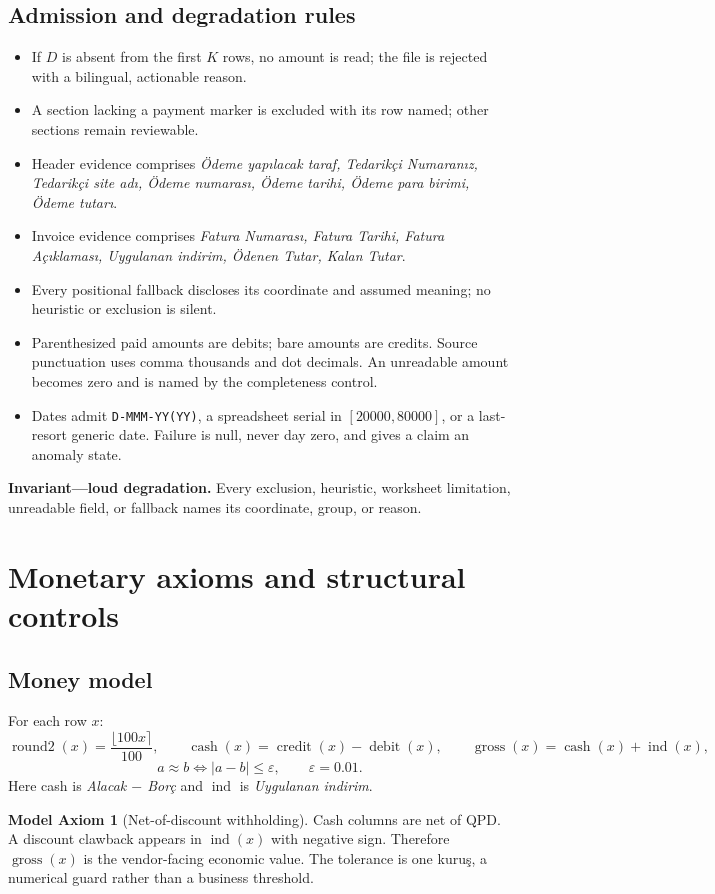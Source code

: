 \documentclass[11pt,a4paper]{article}
\newcommand{\eps}{\varepsilon}
\newcommand{\cash}{\operatorname{cash}}
\newcommand{\gross}{\operatorname{gross}}
\newcommand{\ind}{\operatorname{ind}}
\newcommand{\roundtwo}{\operatorname{round2}}
\theoremstyle{definition}
\newtheorem{axiom}{Model Axiom}
\begin{document}
\subsection{Admission and degradation rules}
\begin{itemize}[leftmargin=1.5em]
\item If $D$ is absent from the first $K$ rows, no amount is read; the
file is rejected with a bilingual, actionable reason.
\item A section lacking a payment marker is excluded with its row named;
other sections remain reviewable.
\item Header evidence comprises \emph{Ödeme yapılacak taraf, Tedarikçi
Numaranız, Tedarikçi site adı, Ödeme numarası, Ödeme tarihi, Ödeme para
birimi, Ödeme tutarı}.
\item Invoice evidence comprises \emph{Fatura Numarası, Fatura Tarihi,
Fatura Açıklaması, Uygulanan indirim, Ödenen Tutar, Kalan Tutar}.
\item Every positional fallback discloses its coordinate and assumed
meaning; no heuristic or exclusion is silent.
\item Parenthesized paid amounts are debits; bare amounts are credits.
Source punctuation uses comma thousands and dot decimals. An unreadable
amount becomes zero and is named by the completeness control.
\item Dates admit \texttt{D-MMM-YY(YY)}, a spreadsheet serial in
$[20000,80000]$, or a last-resort generic date. Failure is null, never
day zero, and gives a claim an anomaly state.
\end{itemize}
\textbf{Invariant---loud degradation.} Every exclusion, heuristic,
worksheet limitation, unreadable field, or fallback names its coordinate,
group, or reason.
\section{Monetary axioms and structural controls}
\subsection{Money model}
For each row $x$:
\[
\roundtwo(x)=\frac{\lfloor100x\rceil}{100},\qquad
\cash(x)=\operatorname{credit}(x)-\operatorname{debit}(x),\qquad
\gross(x)=\cash(x)+\ind(x),
\]
\[
a\approx b\iff |a-b|\le\eps,\qquad \eps=0.01.
\]
Here cash is \emph{Alacak $-$ Borç} and $\ind$ is \emph{Uygulanan
indirim}.

\begin{axiom}[Net-of-discount withholding]
Cash columns are net of QPD. A discount clawback appears in $\ind(x)$
with negative sign. Therefore $\gross(x)$ is the vendor-facing economic
value. The tolerance is one kuruş, a numerical guard rather than a
business threshold.
\end{axiom}
\end{document}
